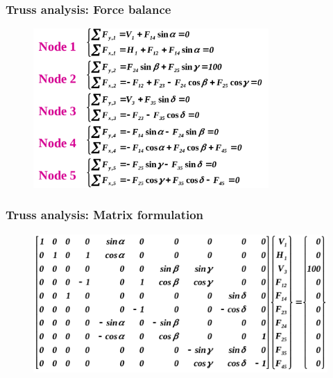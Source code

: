 \documentclass[notes]{beamer}
\begin{document}
\begin{frame}
	\frametitle{Truss analysis: Force balance}
	\begin{figure}[ht]
		\centering
		\includegraphics[width=0.8\textwidth]{figs/force-balance.png}
	\end{figure}
\end{frame}

\begin{frame}
	\frametitle{Truss analysis: Matrix formulation}
	\begin{figure}[ht]
		\centering
		\includegraphics[width=\textwidth]{figs/truss-matrix.png}
	\end{figure}
\end{frame}
\end{document}
